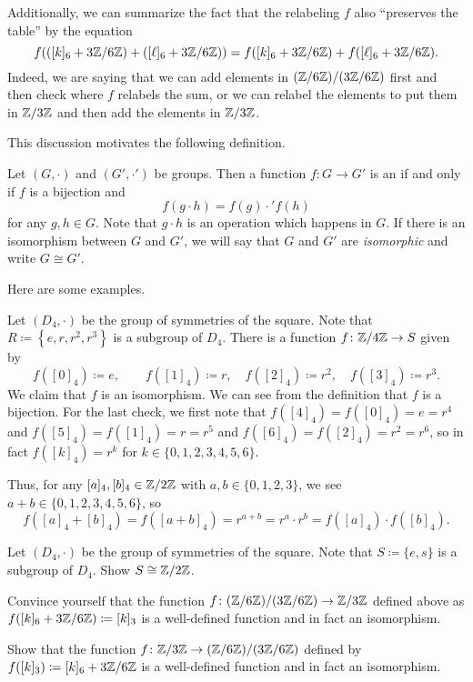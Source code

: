 \documentclass[../main.tex]{subfiles}
\begin{document}
Additionally, we can summarize the fact that the relabeling $f$ also ``preserves the table'' by the equation
\[f(([k]_6+3\mathbb Z/6\mathbb Z)+([\ell]_6+3\mathbb Z/6\mathbb Z))=f([k]_6+3\mathbb Z/6\mathbb Z)+f([\ell]_6+3\mathbb Z/6\mathbb Z).\]
Indeed, we are saying that we can add elements in $(\mathbb Z/6\mathbb Z)/(3\mathbb Z/6\mathbb Z)$ first and then check where $f$ relabels the sum, or we can relabel the elements to put them in $\mathbb Z/3\mathbb Z$ and then add the elements in $\mathbb Z/3\mathbb Z$.

This discussion motivates the following definition.
\begin{definition}[isomorphism]
    Let $(G,\cdot)$ and $(G',\cdot')$ be groups. Then a function $f\colon G\to G'$ is an  if and only if $f$ is a bijection and
    \[f(g\cdot h)=f(g)\cdot'f(h)\]
    for any $g,h\in G$. Note that $g\cdot h$ is an operation which happens in $G$. If there is an isomorphism between $G$ and $G'$, we will say that $G$ and $G'$ are \textit{isomorphic} and write $G\cong G'$.
\end{definition}
Here are some examples.
\begin{example}
    Let $(D_4,\cdot)$ be the group of symmetries of the square. Note that $R\coloneqq\left\{e,r,r^2,r^3\right\}$ is a subgroup of $D_4$. There is a function $f\colon\mathbb Z/4\mathbb Z\to S$ given by
    \[f([0]_4)\coloneqq e,\qquad f([1]_4)\coloneqq r,\quad f([2]_4)\coloneqq r^2,\quad f([3]_4)\coloneqq r^3.\]
    We claim that $f$ is an isomorphism. We can see from the definition that $f$ is a bijection. For the last check, we first note that $f([4]_4)=f([0]_4)=e=r^4$ and $f([5]_4)=f([1]_4)=r=r^5$ and $f([6]_4)=f([2]_4)=r^2=r^6$, so in fact $f([k]_4)=r^k$ for $k\in\{0,1,2,3,4,5,6\}$.
    
    Thus, for any $[a]_4,[b]_4\in\mathbb Z/2\mathbb Z$ with $a,b\in\{0,1,2,3\}$, we see $a+b\in\{0,1,2,3,4,5,6\}$, so
    \[f([a]_4+[b]_4)=f([a+b]_4)=r^{a+b}=r^a\cdot r^b=f([a]_4)\cdot f([b]_4).\]
\end{example}
\begin{exe}
    Let $(D_4,\cdot)$ be the group of symmetries of the square. Note that $S\coloneqq\{e,s\}$ is a subgroup of $D_4$. Show $S\cong\mathbb Z/2\mathbb Z$.
\end{exe}
\begin{exe}
    Convince yourself that the function $f\colon(\mathbb Z/6\mathbb Z)/(3\mathbb Z/6\mathbb Z)\to\mathbb Z/3\mathbb Z$ defined above as $f([k]_6+3\mathbb Z/6\mathbb Z)\coloneqq[k]_3$ is a well-defined function and in fact an isomorphism.
\end{exe}
\begin{exe}
    Show that the function $f\colon\mathbb Z/3\mathbb Z\to(\mathbb Z/6\mathbb Z)/(3\mathbb Z/6\mathbb Z)$ defined by $f([k]_3)\coloneqq[k]_6+3\mathbb Z/6\mathbb Z$ is a well-defined function and in fact an isomorphism.
\end{exe}
\end{document}
